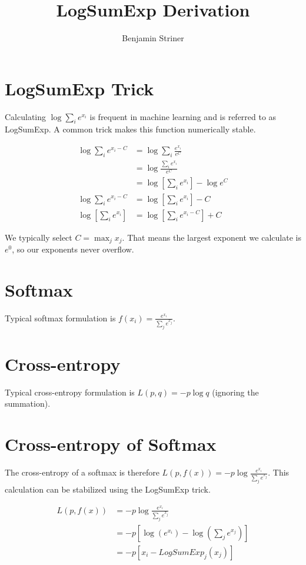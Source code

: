 \documentclass{article}
\begin{document}
\title{LogSumExp Derivation}
\author{Benjamin Striner}

\maketitle

\section{LogSumExp Trick}

Calculating $\log \sum_i e^{x_i} $ is frequent in machine learning and is referred to as LogSumExp. A common trick makes this function numerically stable.

\begin{align}
\log \sum_i e^{x_i - C} &= \log \sum_i \frac{e^{x_i}}{e^{C}} \\
& = \log \frac{\sum_i e^{x_i}}{e^C} \\
& = \log[\sum_i e^{x_i}] - \log e^{C} \\
\log \sum_i e^{x_i - C} & = \log[\sum_i e^{x_i}] - C \\
\log[\sum_i e^{x_i}] &= \log[\sum_i e^{x_i - C}]  + C
\end{align}

We typically select $ C=\max_j x_j $. That means the largest exponent we calculate is $e^0$, so our exponents never overflow.

\section{Softmax}

Typical softmax formulation is $ f(x_i) = \frac{e^{x_i}}{\sum_j e^{x_j}} $.

\section{Cross-entropy}

Typical cross-entropy formulation is $ L(p, q) = - p \log q$ (ignoring the summation).

\section{Cross-entropy of Softmax}

The cross-entropy of a softmax is therefore $L(p,f(x))=-p \log \frac{e^{x_i}}{\sum_j e^{x_j}}$. This calculation can be stabilized using the LogSumExp trick.

\begin{align}
L(p,f(x)) &=-p \log \frac{e^{x_i}}{\sum_j e^{x_j}} \\
& = -p[ \log(e^{x_i}) - \log(\sum_j e^{x_j})] \\
&= -p[ x_i - LogSumExp_j(x_j)]
\end{align}
\end{document}
